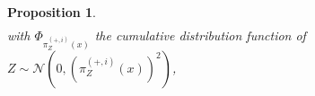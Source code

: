 \documentclass[12pt]{article}
\theoremstyle{Theorem}
\newtheorem{Proposition}[Theorem]{Proposition}
\theoremstyle{definition}
\begin{document}
\begin{Proposition}
{\begin{align}
\end{align}}
with $\Phi_{\pi^{\scriptscriptstyle(+, i)}_{Z}(x)}$ the cumulative distribution function of $Z \sim \mathcal{N}(0, (\pi^{\scriptscriptstyle(+, i)}_{Z}(x))^{2})$, 
\end{Proposition}
\end{document}
